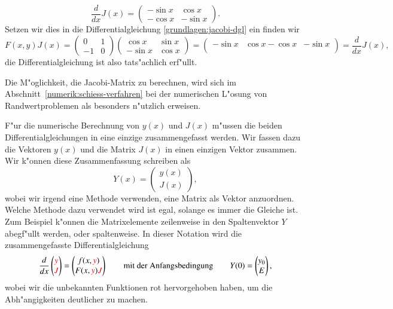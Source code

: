 \begin{beispiel}
\[
\frac{d}{dx}J(x)
=
\begin{pmatrix}
-\sin x& \cos x\\
-\cos x&-\sin x
\end{pmatrix}.
\]
Setzen wir dies in die Differentialgleichung \eqref{grundlagen:jacobi-dgl} ein
finden wir
\[
F(x,y)J(x)
=
\begin{pmatrix}
 0&1\\
-1&0
\end{pmatrix}
\begin{pmatrix}
 \cos x&\sin x\\
-\sin x&\cos x
\end{pmatrix}
=
\begin{pmatrix}
-\sin x& \cos x
-\cos x&-\sin x\\
\end{pmatrix}
=
\frac{d}{dx}J(x),
\]
die Differentialgleichung ist also tats"achlich erf"ullt.
\end{beispiel}
Die M"oglichkeit, die Jacobi-Matrix zu berechnen, wird sich im
Abschnitt~\ref{numerik:schiess-verfahren} bei der numerischen
L"osung von Randwertproblemen als besonders n"utzlich erweisen.

F"ur die numerische Berechnung von $y(x)$ und $J(x)$ m"ussen die
beiden Differentialgleichungen in eine einzige zusammengefasst werden.
Wir fassen dazu die Vektoren $y(x)$ und die Matrix $J(x)$ in einen
einzigen Vektor zusammen. 
Wir k"onnen diese Zusammenfassung schreiben als
\[
Y(x)=\begin{pmatrix}y(x)\\J(x)\end{pmatrix},
\]
wobei wir irgend eine Methode verwenden, eine Matrix als Vektor
anzuordnen.
Welche Methode dazu verwendet wird ist egal, solange es immer die 
Gleiche ist.
Zum Beispiel k"onnen die Matrixelemente zeilenweise in den Spaltenvektor
$Y$ abegf"ullt werden, oder spaltenweise.
In dieser Notation wird die zusammengefasste Differentialgleichung
\begin{equation}
\frac{d}{dx}\begin{pmatrix}\color{red}y\\\color{red}J\end{pmatrix}
=
\begin{pmatrix}
f(x,{\color{red}y})\\
F(x,{\color{red}y}) {\color{red}J}
\end{pmatrix}
\qquad
\text{mit der Anfangsbedingung}
\qquad
Y(0)=
\begin{pmatrix}
y_0\\E
\end{pmatrix},
\end{equation}
wobei wir die unbekannten Funktionen rot hervorgehoben haben, um die
Abh"angigkeiten deutlicher zu machen.

